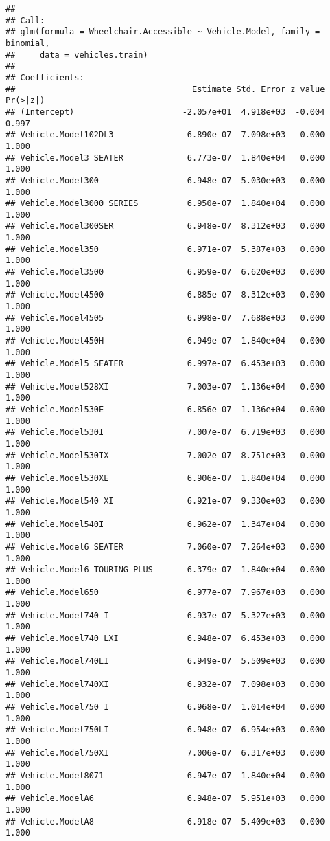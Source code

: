 \documentclass[
]{article}
\begin{document}
\begin{verbatim}
## 
## Call:
## glm(formula = Wheelchair.Accessible ~ Vehicle.Model, family = binomial, 
##     data = vehicles.train)
## 
## Coefficients:
##                                    Estimate Std. Error z value Pr(>|z|)
## (Intercept)                      -2.057e+01  4.918e+03  -0.004    0.997
## Vehicle.Model102DL3               6.890e-07  7.098e+03   0.000    1.000
## Vehicle.Model3 SEATER             6.773e-07  1.840e+04   0.000    1.000
## Vehicle.Model300                  6.948e-07  5.030e+03   0.000    1.000
## Vehicle.Model3000 SERIES          6.950e-07  1.840e+04   0.000    1.000
## Vehicle.Model300SER               6.948e-07  8.312e+03   0.000    1.000
## Vehicle.Model350                  6.971e-07  5.387e+03   0.000    1.000
## Vehicle.Model3500                 6.959e-07  6.620e+03   0.000    1.000
## Vehicle.Model4500                 6.885e-07  8.312e+03   0.000    1.000
## Vehicle.Model4505                 6.998e-07  7.688e+03   0.000    1.000
## Vehicle.Model450H                 6.949e-07  1.840e+04   0.000    1.000
## Vehicle.Model5 SEATER             6.997e-07  6.453e+03   0.000    1.000
## Vehicle.Model528XI                7.003e-07  1.136e+04   0.000    1.000
## Vehicle.Model530E                 6.856e-07  1.136e+04   0.000    1.000
## Vehicle.Model530I                 7.007e-07  6.719e+03   0.000    1.000
## Vehicle.Model530IX                7.002e-07  8.751e+03   0.000    1.000
## Vehicle.Model530XE                6.906e-07  1.840e+04   0.000    1.000
## Vehicle.Model540 XI               6.921e-07  9.330e+03   0.000    1.000
## Vehicle.Model540I                 6.962e-07  1.347e+04   0.000    1.000
## Vehicle.Model6 SEATER             7.060e-07  7.264e+03   0.000    1.000
## Vehicle.Model6 TOURING PLUS       6.379e-07  1.840e+04   0.000    1.000
## Vehicle.Model650                  6.977e-07  7.967e+03   0.000    1.000
## Vehicle.Model740 I                6.937e-07  5.327e+03   0.000    1.000
## Vehicle.Model740 LXI              6.948e-07  6.453e+03   0.000    1.000
## Vehicle.Model740LI                6.949e-07  5.509e+03   0.000    1.000
## Vehicle.Model740XI                6.932e-07  7.098e+03   0.000    1.000
## Vehicle.Model750 I                6.968e-07  1.014e+04   0.000    1.000
## Vehicle.Model750LI                6.948e-07  6.954e+03   0.000    1.000
## Vehicle.Model750XI                7.006e-07  6.317e+03   0.000    1.000
## Vehicle.Model8071                 6.947e-07  1.840e+04   0.000    1.000
## Vehicle.ModelA6                   6.948e-07  5.951e+03   0.000    1.000
## Vehicle.ModelA8                   6.918e-07  5.409e+03   0.000    1.000

\end{verbatim}
\end{document}
